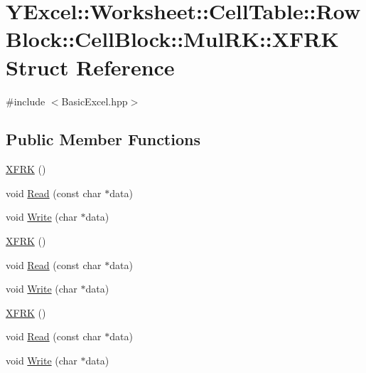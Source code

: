 \hypertarget{struct_y_excel_1_1_worksheet_1_1_cell_table_1_1_row_block_1_1_cell_block_1_1_mul_r_k_1_1_x_f_r_k}{}\section{Y\+Excel\+:\+:Worksheet\+:\+:Cell\+Table\+:\+:Row\+Block\+:\+:Cell\+Block\+:\+:Mul\+R\+K\+:\+:X\+F\+R\+K Struct Reference}
\label{struct_y_excel_1_1_worksheet_1_1_cell_table_1_1_row_block_1_1_cell_block_1_1_mul_r_k_1_1_x_f_r_k}


{\ttfamily \#include $<$Basic\+Excel.\+hpp$>$}

\subsection*{Public Member Functions}
\begin{DoxyCompactItemize}
\item 
\hyperlink{struct_y_excel_1_1_worksheet_1_1_cell_table_1_1_row_block_1_1_cell_block_1_1_mul_r_k_1_1_x_f_r_k_a9171c31558f12862f05c265b343b85f4}{X\+F\+R\+K} ()
\item 
void \hyperlink{struct_y_excel_1_1_worksheet_1_1_cell_table_1_1_row_block_1_1_cell_block_1_1_mul_r_k_1_1_x_f_r_k_aec5293497e75223433f561ae6c9ac173}{Read} (const char $\ast$data)
\item 
void \hyperlink{struct_y_excel_1_1_worksheet_1_1_cell_table_1_1_row_block_1_1_cell_block_1_1_mul_r_k_1_1_x_f_r_k_a79162b5bbaceeada59da87e72b3043c9}{Write} (char $\ast$data)
\item 
\hyperlink{struct_y_excel_1_1_worksheet_1_1_cell_table_1_1_row_block_1_1_cell_block_1_1_mul_r_k_1_1_x_f_r_k_a9171c31558f12862f05c265b343b85f4}{X\+F\+R\+K} ()
\item 
void \hyperlink{struct_y_excel_1_1_worksheet_1_1_cell_table_1_1_row_block_1_1_cell_block_1_1_mul_r_k_1_1_x_f_r_k_aec5293497e75223433f561ae6c9ac173}{Read} (const char $\ast$data)
\item 
void \hyperlink{struct_y_excel_1_1_worksheet_1_1_cell_table_1_1_row_block_1_1_cell_block_1_1_mul_r_k_1_1_x_f_r_k_a79162b5bbaceeada59da87e72b3043c9}{Write} (char $\ast$data)
\item 
\hyperlink{struct_y_excel_1_1_worksheet_1_1_cell_table_1_1_row_block_1_1_cell_block_1_1_mul_r_k_1_1_x_f_r_k_a9171c31558f12862f05c265b343b85f4}{X\+F\+R\+K} ()
\item 
void \hyperlink{struct_y_excel_1_1_worksheet_1_1_cell_table_1_1_row_block_1_1_cell_block_1_1_mul_r_k_1_1_x_f_r_k_aec5293497e75223433f561ae6c9ac173}{Read} (const char $\ast$data)
\item 
void \hyperlink{struct_y_excel_1_1_worksheet_1_1_cell_table_1_1_row_block_1_1_cell_block_1_1_mul_r_k_1_1_x_f_r_k_a79162b5bbaceeada59da87e72b3043c9}{Write} (char $\ast$data)
\end{DoxyCompactItemize}
